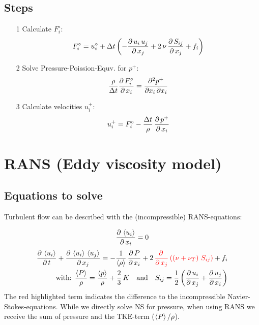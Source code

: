 \documentclass[11pt,a4paper]{article}
\begin{document}
\subsection{Steps}
\begin{itemize}
\item[1] Calculate $F_i^\circ$:
\begin{align*}
F_i^\circ=u_i^\circ+\Delta t\left(-\frac{\partial \, u_i\,u_j}{\partial \, x_j} +2\,\nu\,\frac{\partial \, S_{ij}}{\partial \, x_j}+f_i  \right)
\end{align*}
\item[2] Solve Pressure-Poission-Equv. for $p^+$:
\begin{align*}
\frac{\rho}{\Delta t} \frac{\partial \, F_i^\circ}{\partial \, x_i}  =
\frac{\partial^2 p^+}{\partial x_i\,\partial x_i}
\end{align*}
\item[3] Calculate velocities $u_i^+$:
\begin{align*}
u_i^+
=F_i^\circ-\frac{\Delta t}{\rho}\,\frac{\partial \, p^+}{\partial \, x_i}
\end{align*}
\end{itemize}


\clearpage

\section{RANS (Eddy viscosity model)}
\subsection{Equations to solve}

Turbulent flow can be described with the (incompressible) RANS-equations:

\begin{align}
\frac{\partial \, \left\langle u_i\right\rangle}{\partial \, x_i}=0
\end{align}
\begin{align}
\frac{\partial \, \left\langle u_i\right\rangle}{\partial \, t}+\frac{\partial \, \left\langle u_i\right\rangle\,\left\langle u_j\right\rangle}{\partial \, x_j}=-\frac{1}{\left\langle\rho\right\rangle}\,\frac{\partial \, P}{\partial \, x_i}+2\,\textcolor{red}{\frac{\partial \, }{\partial \, x_j}\left( \left(\nu+\nu_T\right)\,S_{ij} \right)}+f_i
\\\qquad\text{with: }\frac{\left\langle P\right\rangle}{\rho}=\frac{\left\langle p\right\rangle}{\rho}+\frac{2}{3}\,K
\quad \text{and}\quad
S_{ij}=\frac{1}{2}\left(\frac{\partial \, u_i}{\partial \, x_j}+\frac{\partial \, u_j}{\partial \, x_i}\right)
\nonumber
\end{align}
The red highlighted term indicates the difference to the incompressible Navier-Stokes-equations. While we directly solve NS for pressure, when using RANS we receive the sum of pressure and the TKE-term ($\left\langle P\right\rangle/\rho$).
\end{document}

